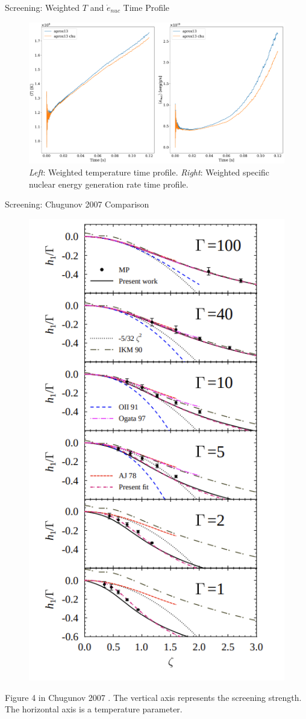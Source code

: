 \documentclass[
	11pt, %
]{beamer}
\begin{document}
\begin{frame}{Screening: Weighted $T$ and $\dot{e}_{nuc}$ Time Profile}

    \begin{figure}
        \centering
        \includegraphics[width=1\linewidth]{screen_time_profile.pdf}
        \caption{{\it Left}: Weighted temperature time profile. {\it Right}: Weighted specific nuclear energy generation rate time profile.}
    \end{figure}
    
\end{frame}


\begin{frame}{Screening: Chugunov 2007 Comparison}
    \begin{figure}
        \centering
        \includegraphics[width=0.33\linewidth]{chugunov2007.png}
    \end{figure}

\scriptsize Figure 4 in Chugunov 2007 \cite{Chugunov_2007}. The vertical axis represents the screening strength. The horizontal axis is a temperature parameter.
    
\end{frame}
\end{document}
